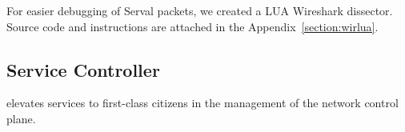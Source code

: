 For easier debugging of Serval packets, we created a LUA Wireshark dissector.
Source code and instructions are attached in the Appendix~\ref{section:wirlua}.



\subsection{Service Controller}
elevates services to first-class citizens in the management of the network control plane.




